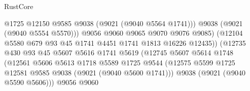 \begin{lexlean}{RustCore}
\begin{coremodule}
                                            @1725
                                            @12150
                                            @9585
                                            @9038
                                            (@9021 (@9040 @5564 @1741)))
                                          @9038
                                          (@9021 (@9040 @5554 @5570)))
                                        @9056
                                        @9060
                                        @9065
                                        @9070
                                        @9076
                                        @9085)
                                      (@12104
                                        @5580
                                        @679
                                        @93
                                        @45
                                        @1741
                                        @4451
                                        @1741
                                        @1813
                                        @16226
                                        @12435))
                                    (@12735
                                      @430
                                      @93
                                      @45
                                      @5607
                                      @5616
                                      @1741
                                      @5619
                                      (@12745
                                        @5607
                                        @5614
                                        @1748
                                        (@12561
                                          @5606
                                          @5613
                                          @1718
                                          @5589
                                          @1725
                                          @9544
                                          (@12575
                                            @5599
                                            @1725
                                            @12581
                                            @9585
                                            @9038
                                            (@9021 (@9040 @5600 @1741)))
                                          @9038
                                          (@9021 (@9040 @5590 @5606)))
                                        @9056
                                        @9060

\end{coremodule}
\end{lexlean}
